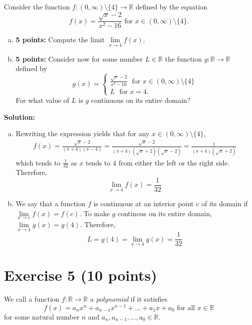 \documentclass[11pt,a4paper]{article}
\begin{document}
\begin{enumerate}[(a)]
Consider the function $f:(0,\infty)\setminus \{ 4 \} \to \mathbb{R}$ defined by the equation
\begin{equation*}
 f(x) = \frac{\sqrt{x} - 2}{x^2 - 16} \text{ for } x \in (0,\infty) \setminus \{ 4 \}.
\end{equation*}
\begin{enumerate}[a)]
	\item \textbf{5 points:} Compute the limit $\underset{x \to 4}{\lim} f(x)$.
	\item \textbf{5 points:} Consider now for some number $L \in \mathbb{R}$ the function $g:\mathbb{R} \to \mathbb{R}$ defined by
	\begin{equation*}
	g(x) = \begin{cases}
	\frac{\sqrt{x} - 2}{x^2 - 16} \,\,\text{ for } x \in (0,\infty) \setminus \{ 4 \} \\
	L \,\,\text{ for } x= 4.
	\end{cases} 
	\end{equation*}
	For what value of $L$ is $g$ continuous on its entire domain?
\end{enumerate}


\noindent\textbf{\textbf{Solution:}}\\
\begin{enumerate}[a)]
	\item Rewriting the expression yields that for any $x \in (0,\infty) \setminus \{4\}$,
	\begin{align*}
		f(x)=\frac{\sqrt{x} - 2}{(x+4)(x-4)} = \frac{\sqrt{x} - 2}{(x+4)(\sqrt{x} + 2)(\sqrt{x} - 2)} =\frac{1}{(x+4)(\sqrt{x} + 2)} 
	\end{align*}
	which tends to $\frac{1}{32}$ as $x$ tends to $4$ from either the left or the right side. Therefore,
	\[\underset{x \to 4}{\lim} f(x) = \frac{1}{32}\]
	\item We say that a function $f$ is continuous at an interior point $c$ of its domain if  $\underset{x \to c}{\lim} f(x)= f(c) $. To make $g$ continous on its entire domain, $ \underset{x \to 4}{\lim} g(x) = g(4)$. Therefore, 
	\[ L = g(4)= \underset{x \to 4}{\lim} g(x) =\frac{1}{32} \]
\end{enumerate}

\section*{Exercise 5 (10 points)}
We call a function $f:\mathbb{R} \to \mathbb{R}$ a \textit{polynomial} if it satisfies
\begin{equation*}
f(x) = a_n x^n + a_{n-1} x^{n-1}+ \dots + a_1 x + a_0 \text{ for all } x \in \mathbb{R}
\end{equation*}
for some natural number $n$ and $a_n, a_{n-1}, \dots, a_0 \in \mathbb{R}$.


\end{enumerate}
\end{document}
